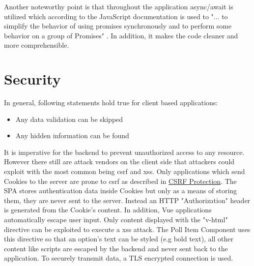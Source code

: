 Another noteworthy point is that throughout the application async/await is utilized which according to the JavaScript documentation is used to "... to simplify the behavior of using promises synchronously and to perform some behavior on a group of Promises" \cite{JavaCriptDoc:online}. In addition, it makes the code cleaner and more comprehensible.

\section{Security}
In general, following statements hold true for client based applications:

\begin{itemize}
  \item Any data validation can be skipped
  \item Any hidden information can be found
\end{itemize}

It is imperative for the backend to prevent unauthorized access to any resource. However there still are attack vendors on the client side that attackers could exploit with the most common being \acrfull{csrf} and \acrfull{xss}. Only applications which send Cookies to the server are prone to \acrshort{csrf} as described in \href{https://security.stackexchange.com/questions/166724/should-i-use-csrf-protection-on-rest-api-endpoints/166798#166798}{CSRF Protection}. The SPA stores authentication data inside Cookies but only as a means of storing them, they are never sent to the server. Instead an HTTP "Authorization" header is generated from the Cookie's content. In addition, Vue applications automatically escape user input. Only content displayed with the "v-html" directive can be exploited to execute a \acrshort{xss} attack. The Poll Item Component uses this directive so that an option's text can be styled (e.g bold text), all other content like scripts are escaped by the backend and never sent back to the application. To securely transmit data, a TLS encrypted connection is used.
